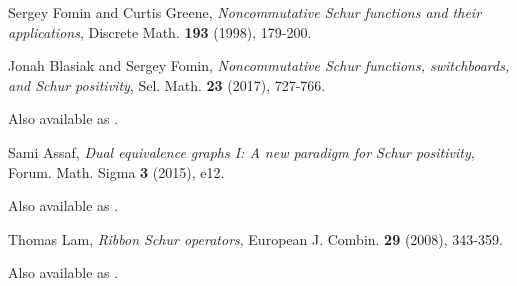 \documentclass{article}
\begin{document}
\begin{thebibliography}{999999}
    \raggedright\footnotesize

    Sergey Fomin and Curtis Greene, 
    \textit{Noncommutative Schur functions and their applications}, 
    Discrete Math. \textbf{193} (1998), 179-200.

    Jonah Blasiak and Sergey Fomin, 
    \textit{Noncommutative Schur functions, switchboards, and Schur positivity},
    Sel. Math. \textbf{23} (2017), 727-766.

    Also available as .

    Sami Assaf,
    \textit{Dual equivalence graphs I: A new paradigm for Schur positivity},
    Forum. Math. Sigma \textbf{3} (2015), e12.

    Also available as .

    Thomas Lam,
    \textit{Ribbon Schur operators},
    European J. Combin. \textbf{29} (2008), 343-359.

    Also available as .



\end{thebibliography}
\end{document}
